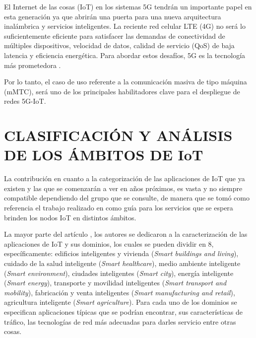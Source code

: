 El Internet de las cosas (IoT) en los sistemas 5G tendrán un importante papel en esta generación ya que abrirán una puerta para una nueva arquitectura inalámbrica y servicios inteligentes. La reciente red celular LTE (4G) no será lo suficientemente eficiente para satisfacer las demandas de conectividad de múltiples dispositivos, velocidad de datos, calidad de servicio (QoS) de baja latencia y eficiencia energética. Para abordar estos desafíos, 5G es la tecnología más prometedora \parencite{Chetri2020}. \newline

Por lo tanto, el caso de uso referente a la comunicación masiva de tipo máquina (mMTC), será uno de los principales habilitadores clave para el despliegue de redes 5G-IoT.


\section{CLASIFICACIÓN Y ANÁLISIS DE LOS ÁMBITOS DE IoT}

La contribución en cuanto a la categorización de las aplicaciones de IoT que ya existen y las que se comenzarán a ver en años próximos, es vasta y no siempre compatible dependiendo del grupo que se consulte, de manera que se tomó como referencia el trabajo realizado en \parencite{NetTrafficIoT} como guía para los servicios que se espera brinden los nodos IoT en distintos ámbitos.\newline

La mayor parte del artículo \parencite{NetTrafficIoT}, los autores se dedicaron a la caracterización de las aplicaciones de IoT y sus dominios, los cuales se pueden dividir en 8, específicamente: edificios inteligentes y vivienda (\textit{Smart buildings and living}), cuidado de la salud inteligente (\textit{Smart healthcare}), medio ambiente inteligente (\textit{Smart environment}), ciudades inteligentes (\textit{Smart city}), energía inteligente (\textit{Smart energy}), transporte y movilidad  inteligentes (\textit{Smart transport and mobility}), fabricación y venta inteligentes (\textit{Smart manufacturing and retail}), agricultura inteligente (\textit{Smart agriculture}). Para cada uno de los dominios se especifican aplicaciones típicas que se podrían encontrar, sus características de tráfico, las tecnologías de red más adecuadas para darles servicio entre otras cosas.\newline

